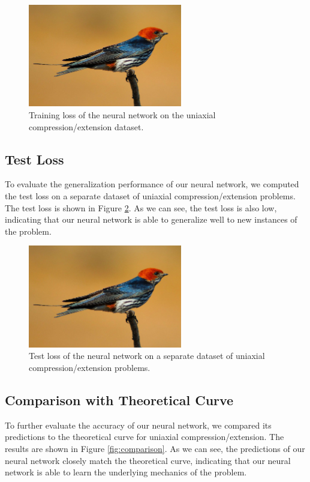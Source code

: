 \documentclass[11pt]{scrartcl} %
\begin{document}
\begin{figure}[h]
\centering
\includegraphics[width=0.6\textwidth]{Figures/swallow.jpg}
\caption{Training loss of the neural network on the uniaxial compression/extension dataset.}
\label{fig:train_loss}
\end{figure}

\subsection{Test Loss}
To evaluate the generalization performance of our neural network, we computed the test loss on a separate dataset of uniaxial compression/extension problems. The test loss is shown in Figure \ref{fig:test_loss}. As we can see, the test loss is also low, indicating that our neural network is able to generalize well to new instances of the problem.

\begin{figure}[h]
\centering
\includegraphics[width=0.6\textwidth]{Figures/swallow.jpg}
\caption{Test loss of the neural network on a separate dataset of uniaxial compression/extension problems.}
\label{fig:test_loss}
\end{figure}

\subsection{Comparison with Theoretical Curve}
To further evaluate the accuracy of our neural network, we compared its predictions to the theoretical curve for uniaxial compression/extension. The results are shown in Figure \ref{fig:comparison}. As we can see, the predictions of our neural network closely match the theoretical curve, indicating that our neural network is able to learn the underlying mechanics of the problem.
\end{document}
